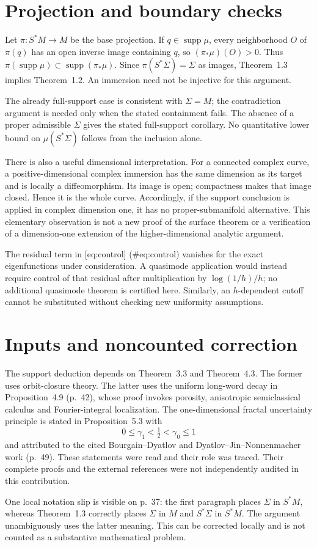 \documentclass[10pt]{article}
\begin{document}
\section*{Projection and boundary checks}
Let \(\pi:S^*M\to M\) be the base projection. If \(q\in\operatorname{supp}\mu\), every neighborhood \(O\) of \(\pi(q)\) has an open inverse image containing \(q\), so \((\pi_*\mu)(O)>0\). Thus \(\pi(\operatorname{supp}\mu)\subset\operatorname{supp}(\pi_*\mu)\). Since \(\pi(S^*\Sigma)=\Sigma\) as images, Theorem 1.3 implies Theorem 1.2. An immersion need not be injective for this argument.\par
The already full-support case is consistent with \(\Sigma=M\); the contradiction argument is needed only when the stated containment fails. The absence of a proper admissible \(\Sigma\) gives the stated full-support corollary. No quantitative lower bound on \(\mu(S^*\Sigma)\) follows from the inclusion alone.\par
There is also a useful dimensional interpretation. For a connected complex curve, a positive-dimensional complex immersion has the same dimension as its target and is locally a diffeomorphism. Its image is open; compactness makes that image closed. Hence it is the whole curve. Accordingly, if the support conclusion is applied in complex dimension one, it has no proper-submanifold alternative. This elementary observation is not a new proof of the surface theorem or a verification of a dimension-one extension of the higher-dimensional analytic argument.\par
The residual term in [eq:control] (\#eq:control) vanishes for the exact eigenfunctions under consideration. A quasimode application would instead require control of that residual after multiplication by \(\log(1/h)/h\); no additional quasimode theorem is certified here. Similarly, an \(h\)-dependent cutoff cannot be substituted without checking new uniformity assumptions.\par
\section*{Inputs and noncounted correction}
The support deduction depends on Theorem 3.3 and Theorem 4.3. The former uses orbit-closure theory. The latter uses the uniform long-word decay in Proposition 4.9 (p. 42), whose proof invokes porosity, anisotropic semiclassical calculus and Fourier-integral localization. The one-dimensional fractal uncertainty principle is stated in Proposition 5.3 with \[0\le\gamma_1<\tfrac12<\gamma_0\le1\] and attributed to the cited Bourgain–Dyatlov and Dyatlov–Jin–Nonnenmacher work (p. 49). These statements were read and their role was traced. Their complete proofs and the external references were not independently audited in this contribution.\par
One local notation slip is visible on p. 37: the first paragraph places \(\Sigma\) in \(S^*M\), whereas Theorem 1.3 correctly places \(\Sigma\) in \(M\) and \(S^*\Sigma\) in \(S^*M\). The argument unambiguously uses the latter meaning. This can be corrected locally and is not counted as a substantive mathematical problem.\par
\end{document}
